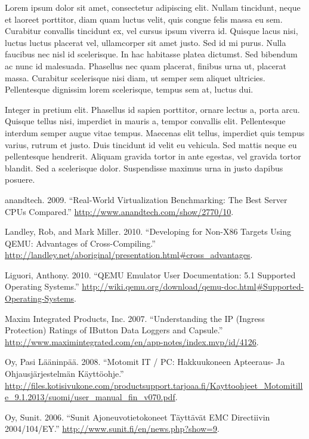 \documentclass[]{article}
\begin{document}
Lorem ipsum dolor sit amet, consectetur adipiscing elit. Nullam
tincidunt, neque et laoreet porttitor, diam quam luctus velit, quis
congue felis massa eu sem. Curabitur convallis tincidunt ex, vel cursus
ipsum viverra id. Quisque lacus nisi, luctus luctus placerat vel,
ullamcorper sit amet justo. Sed id mi purus. Nulla faucibus nec nisl id
scelerisque. In hac habitasse platea dictumst. Sed bibendum ac nunc id
malesuada. Phasellus nec quam placerat, finibus urna ut, placerat massa.
Curabitur scelerisque nisi diam, ut semper sem aliquet ultricies.
Pellentesque dignissim lorem scelerisque, tempus sem at, luctus dui.

Integer in pretium elit. Phasellus id sapien porttitor, ornare lectus a,
porta arcu. Quisque tellus nisi, imperdiet in mauris a, tempor convallis
elit. Pellentesque interdum semper augue vitae tempus. Maecenas elit
tellus, imperdiet quis tempus varius, rutrum et justo. Duis tincidunt id
velit eu vehicula. Sed mattis neque eu pellentesque hendrerit. Aliquam
gravida tortor in ante egestas, vel gravida tortor blandit. Sed a
scelerisque dolor. Suspendisse maximus urna in justo dapibus posuere.

anandtech. 2009. ``Real-World Virtualization Benchmarking: The Best
Server CPUs Compared.'' \url{http://www.anandtech.com/show/2770/10}.

Landley, Rob, and Mark Miller. 2010. ``Developing for Non-X86 Targets
Using QEMU: Advantages of Cross-Compiling.''
\url{http://landley.net/aboriginal/presentation.html\#cross_advantages}.

Liguori, Anthony. 2010. ``QEMU Emulator User Documentation: 5.1
Supported Operating Systems.''
\url{http://wiki.qemu.org/download/qemu-doc.html\#Supported-Operating-Systems}.

Maxim Integrated Products, Inc. 2007. ``Understanding the IP (Ingress
Protection) Ratings of IButton Data Loggers and Capsule.''
\url{http://www.maximintegrated.com/en/app-notes/index.mvp/id/4126}.

Oy, Pasi Lääninpää. 2008. ``Motomit IT / PC: Hakkuukoneen Apteeraus- Ja
Ohjausjärjestelmän Käyttöohje.''
\url{http://files.kotisivukone.com/productsupport.tarjoaa.fi/Kayttoohjeet_Motomitille_9.1.2013/suomi/user_manual_fin_v070.pdf}.

Oy, Sunit. 2006. ``Sunit Ajoneuvotietokoneet Täyttävät EMC Directiivin
2004/104/EY.'' \url{http://www.sunit.fi/en/news.php?show=9}.
\end{document}
